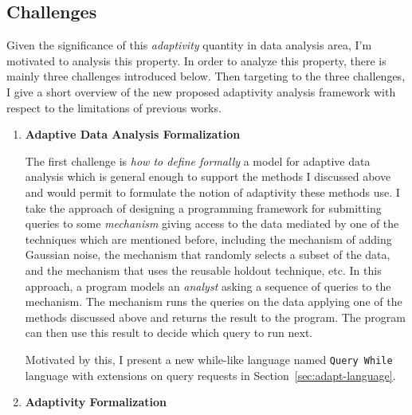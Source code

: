 \subsection{Challenges}
\label{sec:adapt-challenge}
Given the significance of this \emph{adaptivity} quantity in data analysis area,
I'm motivated to analysis this property.
In order to analyze this property, there is mainly three challenges introduced below.
Then targeting to the three challenges, I give a short overview of the new proposed adaptivity analysis framework
with respect to the limitations of previous works.

\begin{enumerate}
 \item
 \textbf{Adaptive Data Analysis Formalization}

The first challenge is \emph{how to define formally} a model for adaptive data analysis which is general enough to support the methods I discussed above and would permit to formulate the notion of adaptivity these methods use. 
I take the approach of designing a programming framework for submitting queries to some \emph{mechanism} giving access 
to the data mediated by one of the techniques which are mentioned before, 
including the mechanism of adding Gaussian noise, 
the mechanism that randomly selects a subset of the data, 
and the mechanism that uses the reusable holdout technique, etc. 
In this approach, a program models an \emph{analyst} asking a sequence of queries to the mechanism. 
The mechanism runs the queries on the data applying one of the methods discussed above and returns the result to the program. The program can then use this result to decide which query to run next. 

Motivated by this, I present a new while-like language 
named {\tt Query While} language with extensions on query requests in Section~\ref{sec:adapt-language}.

\item 
\textbf{Adaptivity Formalization}


\end{enumerate}
